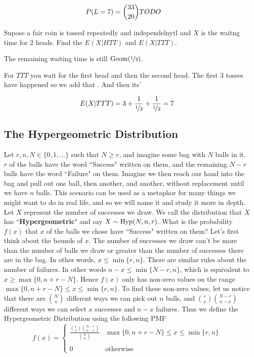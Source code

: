\documentclass{report}
\begin{document}
\[
    P(L=7)=\binom{33}{20}TODO\quad
\]

\begin{example}
    Supose a fair coin is tossed repeatedly and independelnytl and $X$ is the waitng time for 2 heads. Find the $E(X|HTT)$ and $E(X|TTT)$.

    The remaining waiting time is still $\text{Geom}(\nicefrac 12)$. 

    For $TTT$ you wait for the first head and then the second head. The first 3 tosses have happened so we add that . And then its'

    \[
        E(X|TTT)=3+\frac{1}{\nicefrac 12}+\frac{1}{\nicefrac 12}=7
    \]
    \todo
        
\end{example}

\subsection{The Hypergeometric Distribution}
\newcommand{\hyp}{\textup{Hyp}}
Let $r,n,N\in \{0,1,...\}$ such that $N\ge r$, and imagine some bag with $N$ balls in it. $r$ of the balls have the word ``Success" written on them, and the remaining $N-r$ balls have the word ``Failure" on them. Imagine we then reach our hand into the bag and pull out one ball, then another, and another, without replacement until we have $n$ balls. This scenario can be used as a metaphor for many things we might want to do in real life, and so we will name it and study it more in depth. Let $X$ represent the number of successes we draw. We call the distribution that $X$ has ``\textbf{Hypergeometric}" and say $X\sim \hyp(N,n,r)$. What is the probability $f(x)$ that $x$ of the balls we chose have ``Success" written on them? Let's first think about the bounds of $x$. The number of successes we draw can't be more than the number of balls we draw or greater than the number of successes there are in the bag. In other words, $x\le \min\{r,n\}$. There are similar rules about the number of failures. In other words $n-x\le \min\{N-r, n\}$, which is equivalent to $x\ge \max\{0, n+r-N\}$. Hence $f(x)$ only has non-zero values on the range $\max\{0, n+r-N\}\le x \le \min\{r,n\}$. To find these non-zero values, let us notice that there are $\binom Nn$ different ways we can pick out $n$ balls, and $\binom r x \binom {N-r}{n-x}$ different ways we can select $x$ successes and $n-x$ failures. Thus we define the Hypergeometric Distribution using the following PMF
\[
    f(x)=\begin{cases}
        \displaystyle\frac{\binom r x \binom {N-r}{n-x}}{\binom Nn} & \max\{0, n+r-N\}\le x \le \min\{r,n\} \\\\
        0 & \text{otherwise}
    \end{cases}
\]
\end{document}
